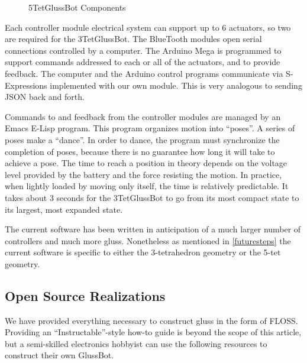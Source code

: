 \documentclass[11pt]{article}
\begin{document}
\begin{figure}[!ht]
  \centering
    \caption[5TetGlussBot Components]{5TetGlussBot Components}
      \label{5TetGlussBot}
\end{figure}


Each controller module electrical system can support up to 6 actuators, so two are required for the 3TetGlussBot.
The BlueTooth modules open serial connections controlled by a computer.
The Arduino Mega is programmed to support commands addressed to each or all of the actuators, and
to provide feedback. The computer and the Arduino control programs communicate via S-Expressions
implemented with our own module. This is very analogous to sending JSON back and forth.

Commands to and feedback from the controller modules are managed by an Emacs E-Lisp program.
This program organizes motion into ``poses''. A series of poses make a ``dance''.
In order to dance, the program must synchronize the completion of poses, because there is no
guarantee how long it will take to achieve a pose. The time to reach a position in theory
depends on the voltage level provided by the battery and the force resisting the motion.
In practice, when lightly loaded by moving only itself, the time is relatively predictable. It takes
about 3 seconds for the 3TetGlussBot to go from its most compact state to its largest, most expanded state.

The current software has been written in anticipation of a much larger number of controllers and much more gluss.
Nonetheless as mentioned in \ref{futuresteps} the current software is specific to either the 3-tetrahedron geometry or the
5-tet geometry.


\subsection{Open Source Realizations}

We have provided everything necessary to construct gluss in the form of FLOSS. Providing an ``Instructable''-style
how-to guide is beyond the scope of this article, but a semi-skilled electronics hobbyist can use the
following resources to construct their own GlussBot.
\end{document}
